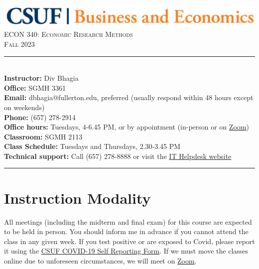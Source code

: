 \documentclass{syllabus}
\begin{document}
\begin{center}
\includegraphics[scale=0.22]{CBE-Wordmark-CMYK} \\ \vspace{0.5em}
{\large \textsc{ECON 340: Economic Research Methods}} \\
{\large \textsc{Fall 2023}}
\end{center}

\begin{center}
\begin{minipage}[t]{\textwidth}
\rule{\textwidth}{0.5pt} \\
\textbf{Instructor:} Div Bhagia \\
\textbf{Office:} SGMH 3361 \\
\textbf{Email:} dbhagia@fullerton.edu, preferred (usually respond within 48 hours except on weekends) \\
\textbf{Phone:} (657) 278-2914 \\
\textbf{Office hours:} Tuesdays, 4-6.45 PM, or by appointment (in-person or on \href{https://fullerton.zoom.us/j/81895171931}{Zoom}) \\
\textbf{Classroom:} SGMH 2113 \\
\textbf{Class Schedule:} Tuesdays and Thursdays, 2.30-3.45 PM \\
\textbf{Technical support:} Call (657) 278-8888 or visit the \href{https://www.fullerton.edu/it/students/helpdesk/index.php}{IT Helpdesk website} \\
\rule{\textwidth}{0.5pt} 
\end{minipage}
\end{center}

\vspace{0.35cm}
\section*{Instruction Modality}
All meetings (including the midterm and final exam) for this course are expected to be held in person. You should inform me in advance if you cannot attend the class in any given week. If you test positive or are exposed to Covid, please report it using the \href{https://coronavirus.fullerton.edu/report-covid-19-case-or-exposure/}{CSUF COVID-19 Self Reporting Form}. If we must move the classes online due to unforeseen circumstances, we will meet on \href{https://fullerton.zoom.us/j/81895171931}{Zoom}.
\end{document}
